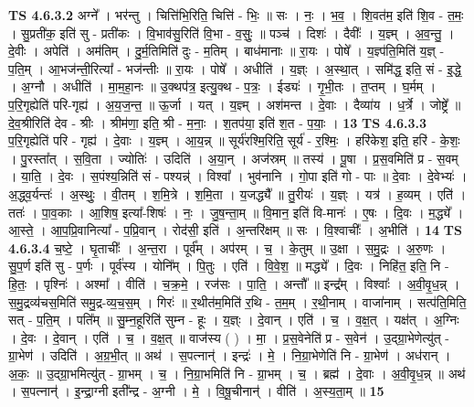 \documentclass[17pt]{extarticle}
\begin{document}
                  \newline
                                \textbf{ TS 4.6.3.2} \newline
                  अग्ने᳚ । भर॑न्तु । चित्ति॑भि॒रिति॒ चित्ति॑ - भिः॒ ॥ सः । नः॒ । भ॒व॒ । शि॒वत॑म॒ इति॑ शि॒व - त॒मः॒ । सु॒प्रती॑क॒ इति॑ सु - प्रती॑कः । वि॒भाव॑सु॒रिति॑ वि॒भा - व॒सुः॒ ॥ पञ्च॑ । दिशः॑ । दैवीः᳚ । य॒ज्ञ्म् । अ॒व॒न्तु॒ । दे॒वीः । अपेति॑ । अम॑तिम् । दु॒र्म॒तिमिति॑ दुः - म॒तिम् । बाध॑मानाः ॥ रा॒यः । पोषे᳚ । य॒ज्ञ्प॑ति॒मिति॑ य॒ज्ञ् - प॒ति॒म् । आ॒भज॑न्ती॒रित्या᳚ - भज॑न्तीः ॥ रा॒यः । पोषे᳚ । अधीति॑ । य॒ज्ञ्ः । अ॒स्था॒त् । समि॑द्ध॒ इति॒ सं - इ॒द्धे॒ । अ॒ग्नौ । अधीति॑ । मा॒म॒हा॒नः ॥ उ॒क्थप॑त्र॒ इत्यु॒क्थ - प॒त्रः॒ । ईड्यः॑ । गृ॒भी॒तः । त॒प्तम् । घ॒र्मम् । प॒रि॒गृह्येति॑ परि-गृह्य॑ । अ॒य॒ज॒न्त॒ ॥ ऊ॒र्जा । यत् । य॒ज्ञ्म् । अश॑मन्त । दे॒वाः । दैव्या॑य । ध॒र्त्रे । जोष्ट्रे᳚ ॥ दे॒व॒श्रीरिति॑ देव - श्रीः । श्रीम॑णा॒ इति॒ श्री - म॒नाः॒ । श॒तप॑या॒ इति॑ श॒त - प॒याः॒ । \textbf{  13} \newline
                  \newline
                                \textbf{ TS 4.6.3.3} \newline
                  प॒रि॒गृह्येति॑ परि - गृह्य॑ । दे॒वाः । य॒ज्ञ्म् । आ॒य॒न्न् ॥ सूर्य॑रश्मि॒रिति॒ सूर्य॑ - र॒श्मिः॒ । हरि॑केश॒ इति॒ हरि॑ - के॒शः॒ । पु॒रस्ता᳚त् । स॒वि॒ता । ज्योतिः॑ । उदिति॑ । अ॒या॒न् । अज॑स्रम् ॥ तस्य॑ । पू॒षा । प्र॒स॒वमिति॑ प्र - स॒वम् । या॒ति॒ । दे॒वः । स॒पंश्य॒न्निति॑ सं - पश्यन्न्॑ । विश्वा᳚ । भुव॑नानि । गो॒पा इति॑ गो - पाः ॥ दे॒वाः । दे॒वेभ्यः॑ । अ॒द्ध्व॒र्यन्तः॑ । अ॒स्थुः॒ । वी॒तम् । श॒मि॒त्रे । श॒मि॒ता । य॒जद्ध्यै᳚ ॥ तु॒रीयः॑ । य॒ज्ञ्ः । यत्र॑ । ह॒व्यम् । एति॑ । ततः॑ । पा॒व॒काः । आ॒शिष॒ इत्या᳚-शिषः॑ । नः॒ । जु॒ष॒न्ता॒म् ॥ वि॒मान॒ इति॑ वि-मानः॑ । ए॒षः । दि॒वः । म॒द्ध्ये᳚ । आ॒स्ते॒ । आ॒प॒प्रि॒वानित्या᳚ - प॒प्रि॒वान् । रोद॑सी॒ इति॑ । अ॒न्तरि॑क्षम् ॥ सः । वि॒श्वाचीः᳚ । अ॒भीति॑ । \textbf{  14} \newline
                  \newline
                                \textbf{ TS 4.6.3.4} \newline
                  च॒ष्टे॒ । घृ॒ताचीः᳚ । अ॒न्त॒रा । पूर्व᳚म् । अप॑रम् । च॒ । के॒तुम् ॥ उ॒क्षा । स॒मु॒द्रः । अ॒रु॒णः । सु॒प॒र्ण इति॑ सु - प॒र्णः । पूर्व॑स्य । योनि᳚म् । पि॒तुः । एति॑ । वि॒वे॒श॒ ॥ मद्ध्ये᳚ । दि॒वः । निहि॑त॒ इति॒ नि - हि॒तः॒ । पृश्निः॑ । अश्मा᳚ । वीति॑ । च॒क्र॒मे॒ । रज॑सः । पा॒ति॒ । अन्तौ᳚ ॥ इन्द्र᳚म् । विश्वाः᳚ । अ॒वी॒वृ॒ध॒न्न् । स॒मु॒द्रव्य॑चस॒मिति॑ समु॒द्र-व्य॒च॒स॒म् । गिरः॑ ॥ र॒थीत॑म॒मिति॑ र॒थि - त॒म॒म् । र॒थी॒नाम् । वाजा॑नाम् । सत्प॑ति॒मिति॒ सत् - प॒ति॒म् । पति᳚म् ॥ सु॒म्न॒हूरिति॑ सुम्न - हूः । य॒ज्ञ्ः । दे॒वान् । एति॑ । च॒ । व॒क्ष॒त् । यक्ष॑त् । अ॒ग्निः । दे॒वः । दे॒वान् । एति॑ । च॒ । व॒क्ष॒त् ॥ वाज॑स्य ( ) । मा॒ । प्र॒स॒वेनेति॑ प्र - स॒वेन॑ । उ॒द्ग्रा॒भेणेत्यु॑त् - ग्रा॒भेण॑ । उदिति॑ । अ॒ग्र॒भी॒त् ॥ अथ॑ । स॒पत्नान्॑ । इन्द्रः॑ । मे॒ । नि॒ग्रा॒भेणेति॑ नि - ग्रा॒भेण॑ । अध॑रान् । अ॒कः॒ ॥ उ॒द्ग्रा॒भमित्यु॑त् - ग्रा॒भम् । च॒ । नि॒ग्रा॒भमिति॑ नि - ग्रा॒भम् । च॒ । ब्रह्म॑ । दे॒वाः । अ॒वी॒वृ॒ध॒न्न् ॥ अथ॑ । स॒पत्नान्॑ । इ॒न्द्रा॒ग्नी इती᳚न्द्र - अ॒ग्नी । मे॒ । वि॒षू॒चीनान्॑ । वीति॑ । अ॒स्य॒ता॒म् ॥ \textbf{  15} \newline
\end{document}
